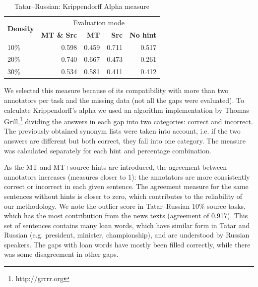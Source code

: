 \documentclass[11pt]{article}
\newcommand{\comment}[1]{\marginpar{\scriptsize\sf \textcolor{blue}{#1}}}
\begin{document}
\begin{table}
\centering
  \begin{tabular}{|l|r|r|r|r|}
  \hline
 \multirow{2}{*}{\textbf{Density}} & \multicolumn{4}{|c|}{Evaluation mode} \\\cline{2-5}
                                            & \textbf{MT \& Src} & \textbf{MT} & \textbf{Src} & \textbf{No hint} \\
\hline
10\%&0.598&0.459 &0.711 &0.517 \\
20\%&0.740&0.667 &0.473 &0.261 \\
30\%&0.534&0.581 &0.411 &0.412 \\
\hline
\end{tabular}
\caption {Tatar--Russian: Krippendorff Alpha measure} 
\label{table:alpha-tat-rus}
\end{table}
We selected this measure because of its compatibility with more than two annotators per task and the missing data (not all the gaps were evaluated). To calculate Krippendorff's alpha we used an algorithm implementation by Thomas Grill,\footnote{http://grrrr.org}\comment{MLF: Give a direct reference: I could not find the algorithm in such a wide website. Use tinyurl if it is too long.} dividing the answers in each gap into two categories: correct and incorrect. The previously obtained synonym lists were taken into account, i.e. if the two answers are different but both correct, they fall into one category. The measure was calculated separately for each hint and percentage combination.

As the MT and MT+source hints are introduced, the agreement between annotators increases (measures closer to 1): the annotators are more consistently correct or incorrect in each given sentence.\comment{EA: I cite Juan Antonio here, because I am not completely sure what alpha shows about our experiment (lack of knowledge on my part)}  The agreement measure for the same sentences without hints is closer to zero, which contributes to the reliability of our methodology. We note the outlier score in Tatar--Russian 10\% source tasks, which has the most contribution from the news texts (agreement of 0.917). This set of sentences contains many loan words, which have similar form in Tatar and Russian (e.g. president, minister, championship), and are understood by Russian speakers. The gaps with loan words have mostly been filled correctly, while there was some disagreement in other gaps.



\end{document}
